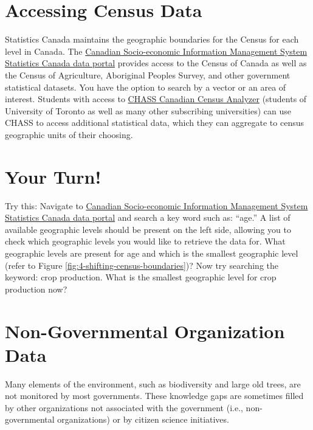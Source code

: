 \documentclass[
]{book}
\begin{document}
\section{Accessing Census Data}\label{accessing-census-data}

Statistics Canada maintains the geographic boundaries for the Census for each level in Canada. The \href{https://www150.statcan.gc.ca/n1/en/type/data}{Canadian Socio-economic Information Management System Statistics Canada data portal} provides access to the Census of Canada as well as the Census of Agriculture, Aboriginal Peoples Survey, and other government statistical datasets. You have the option to search by a vector or an area of interest. Students with access to \href{http://dc1.chass.utoronto.ca/census/index.html}{CHASS Canadian Census Analyzer} (students of University of Toronto as well as many other subscribing universities) can use CHASS to access additional statistical data, which they can aggregate to census geographic units of their choosing.

\section*{Your Turn!}\label{your-turn-2}

Try this: Navigate to \href{https://www150.statcan.gc.ca/n1/en/type/data}{Canadian Socio-economic Information Management System Statistics Canada data portal} and search a key word such as: ``age.'' A list of available geographic levels should be present on the left side, allowing you to check which geographic levels you would like to retrieve the data for. What geographic levels are present for age and which is the smallest geographic level (refer to Figure \ref{fig:4-shifting-census-boundaries})? Now try searching the keyword: crop production. What is the smallest geographic level for crop production now?

\section{Non-Governmental Organization Data}\label{non-governmental-organization-data}

Many elements of the environment, such as biodiversity and large old trees, are not monitored by most governments. These knowledge gaps are sometimes filled by other organizations not associated with the government (i.e., non-governmental organizations) or by citizen science initiatives.
\end{document}
